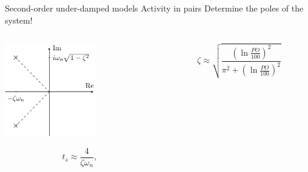 \documentclass[presentation,aspectratio=169]{beamer}
\begin{document}
\begin{frame}[label={sec:orgb1998e9}]{Second-order under-damped models}
\alert{Activity in pairs} Determine the poles of the system!
\begin{columns}
\begin{column}{0.3\columnwidth}
\begin{center}
    \includegraphics[width=4cm]{../../figures/implane-second-order-poles}
\end{center}

\[    t_s \approx \frac{4}{\zeta\omega_n}, \]
\end{column}
\begin{column}{0.7\columnwidth}
\begin{center}
\end{center}

\[   \zeta \approx \sqrt{\frac{(\ln \frac{PO}{100})^2}{\pi^2 + (\ln \frac{PO}{100})^2}} \]
\end{column}
\end{columns}
\end{frame}
\end{document}
